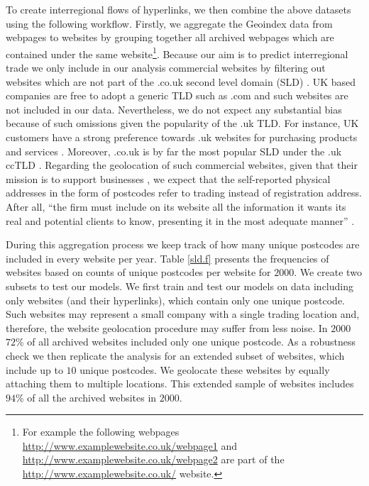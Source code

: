 \documentclass[]{interact}
\theoremstyle{plain}%
\theoremstyle{definition}
\theoremstyle{remark}
\begin{document}
To create interregional flows of hyperlinks, we then combine the above
datasets using the following workflow. Firstly, we aggregate the
Geoindex data from webpages to websites by grouping together all
archived webpages which are contained under the same website\footnote{For
  example the following webpages
  \url{http://www.examplewebsite.co.uk/webpage1} and
  \url{http://www.examplewebsite.co.uk/webpage2} are part of the
  \url{http://www.examplewebsite.co.uk/} website.}. Because our aim is
to predict interregional trade we only include in our analysis
commercial websites by filtering out websites which are not part of the
.co.uk second level domain (SLD) \citep{THELWALL2000441}. UK based
companies are free to adopt a generic TLD such as .com and such websites
are not included in our data. Nevertheless, we do not expect any
substantial bias because of such omissions given the popularity of the
.uk TLD. For instance, UK customers have a strong preference towards .uk
websites for purchasing products and services \citep{hope}. Moreover,
.co.uk is by far the most popular SLD under the .uk ccTLD
\citep{tranos2020digital}. Regarding the geolocation of such commercial
websites, given that their mission is to support businesses
\citep{blazquez2018big}, we expect that the self-reported physical
addresses in the form of postcodes refer to trading instead of
registration address. After all, ``the firm must include on its website
all the information it wants its real and potential clients to know,
presenting it in the most adequate manner'' \citep[p.~364]{Hernandez}.

During this aggregation process we keep track of how many unique
postcodes are included in every website per year. Table \ref{sld.f}
presents the frequencies of websites based on counts of unique postcodes
per website for \(2000\). We create two subsets to test our models. We
first train and test our models on data including only websites (and
their hyperlinks), which contain only one unique postcode. Such websites
may represent a small company with a single trading location and,
therefore, the website geolocation procedure may suffer from less noise.
In \(2000\) \(72\)\% of all archived websites included only one unique
postcode. As a robustness check we then replicate the analysis for an
extended subset of websites, which include up to \(10\) unique
postcodes. We geolocate these websites by equally attaching them to
multiple locations. This extended sample of websites includes \(94\)\%
of all the archived websites in \(2000\).
\end{document}
